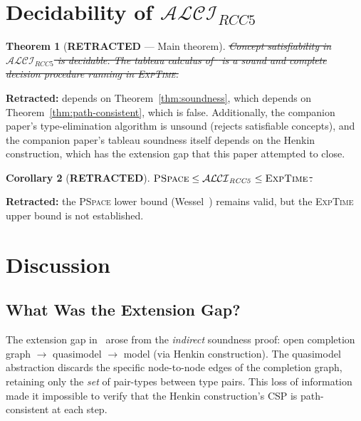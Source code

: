 \documentclass[a4paper,11pt]{article}
\newtheorem{theorem}{Theorem}[section]
\newtheorem{corollary}[theorem]{Corollary}
\theoremstyle{definition}
\newcommand{\ALCIRCC}[1]{\ensuremath{\mathcal{ALCI}_{\mathit{RCC#1}}}}
\newcommand{\EXPTIME}{\textsc{ExpTime}}
\newcommand{\PSPACE}{\textsc{PSpace}}
\begin{document}
\section{Decidability of $\ALCIRCC{5}$}
\label{sec:decidability}

\begin{theorem}[\textbf{RETRACTED} --- Main theorem]
\label{thm:main}
\sout{Concept satisfiability in $\ALCIRCC{5}$ is decidable.  The tableau
calculus of~\cite{CompanionPaper} is a sound and complete decision
procedure running in \EXPTIME.}
\end{theorem}

\noindent
\textbf{Retracted:} depends on Theorem~\ref{thm:soundness}, which
depends on Theorem~\ref{thm:path-consistent}, which is false.
Additionally, the companion paper's type-elimination algorithm is
unsound (rejects satisfiable concepts), and the companion paper's
tableau soundness itself depends on the Henkin construction, which
has the extension gap that this paper attempted to close.

\begin{corollary}[\textbf{RETRACTED}]
\label{cor:complexity}
\sout{$\PSPACE \leq \ALCIRCC{5} \leq \EXPTIME$.}
\end{corollary}

\noindent
\textbf{Retracted:} the \PSPACE{} lower bound
(Wessel~\cite{Wessel2003}) remains valid, but the \EXPTIME{} upper
bound is not established.


\section{Discussion}
\label{sec:discussion}

\subsection{What Was the Extension Gap?}

The extension gap in~\cite{CompanionPaper} arose from the
\emph{indirect} soundness proof: open completion graph $\to$
quasimodel $\to$ model (via Henkin construction).  The quasimodel
abstraction discards the specific node-to-node edges of the completion
graph, retaining only the \emph{set} of pair-types between type pairs.
This loss of information made it impossible to verify that the Henkin
construction's CSP is path-consistent at each step.
\end{document}
